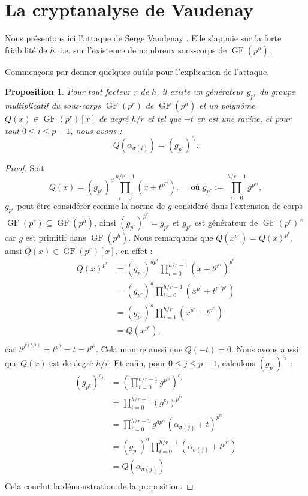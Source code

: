 \documentclass[a4paper, titlepage]{article}
\newtheorem{prop}[theo]{Proposition}
\theoremstyle{definition}
\theoremstyle{remark}
\def\gf{\operatorname{GF}}
\begin{document}
\section{La cryptanalyse de Vaudenay}

Nous présentons ici l'attaque de Serge Vaudenay \cite{vaudenay2000}. Elle s'appuie sur la forte friabilité de $h$, i.e. sur l'existence de nombreux sous-corps de $\gf(p^h)$.

Commençons par donner quelques outils pour l'explication de l'attaque.

\begin{prop}\label{premierePropVaudenay}
Pour tout facteur $r$ de $h$, il existe un générateur $g_{p^r}$ du groupe multiplicatif du sous-corps $\gf(p^r)$ de $\gf(p^h)$ et un polynôme $Q(x) \in \gf(p^r)[x]$ de degré $h/r$ et tel que $-t$ en est une racine, et pour tout $0\leqslant i \leqslant p-1$, nous avons :
$$Q\left(\alpha_{\sigma(i)}\right) = (g_{p^r})^{c_i}.$$
\end{prop}

\begin{proof}
Soit 
$$Q(x) = (g_{p^r})^d \prod_{i=0}^{h/r-1} \left(x+t^{p^{ri}}\right),
\quad \text{ où } g_{p^r} := \prod_{i=0}^{h/r-1} g^{p^{ri}},$$
$g_{p^r}$ peut être considérer comme la norme de $g$ considéré dans l'extension de corps $\gf(p^r) \subseteq \gf(p^h)$, ainsi $(g_{p^r})^{p^r} = g_{p^r}$ et $g_{p^r}$ est générateur de $\gf(p^r)^\times$ car $g$ est primitif dans $\gf(p^h)$. Nous remarquons que $Q\left(x^{p^r}\right) = Q(x)^{p^r}$, ainsi $Q(x) \in \gf(p^r)[x]$, en effet :
\begin{align*}
Q\left(x\right)^{p^r} &= (g_{p^r})^{dp^r} \prod_{i=0}^{h/r-1} \left(x+t^{p^{ri}}\right)^{p^r} \\
&= (g_{p^r})^{d} \prod_{i=0}^{h/r-1} \left(x^{p^r} + t^{p^{ri}p^r}\right) \\
&= (g_{p^r})^{d} \prod_{i=1}^{h/r} \left(x^{p^r} + t^{p^{ri}}\right) \\
&= Q\left(x^{p^r}\right), \\
\end{align*}
car $t^{p^{r(h/r)}} = t^{p^h} = t = t^{p^0}$. Cela montre aussi que $Q(-t) = 0$. Nous avons aussi que $Q(x)$ est de degré $h/r$. Et enfin, pour $0\leqslant j \leqslant p-1$, calculons $(g_{p^r})^{c_i}$ :
\begin{align*}
(g_{p^r})^{c_j} &= \left(\prod_{i=0}^{h/r-1} g^{p^{ri}}\right)^{c_j}\\
&= \prod_{i=0}^{h/r-1} \left(g^{c_j}\right)^{p^{ri}}\\
&= \prod_{i=0}^{h/r-1} g^{dp^{ri}}\left(\alpha_{\sigma(j)} + t\right)^{p^{ri}}\\
&= (g_{p^r})^d \prod_{i=0}^{h/r-1} \left(\alpha_{\sigma(j)} + t^{p^{ri}}\right)\\
&= Q\left(\alpha_{\sigma(j)}\right) \\
\end{align*}
Cela conclut la démonstration de la proposition.
\end{proof}
\end{document}
